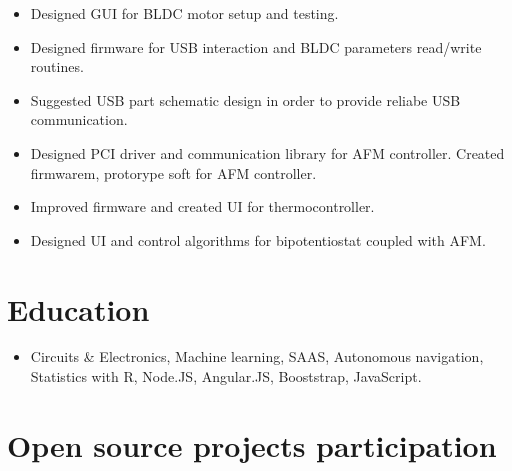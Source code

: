 \documentclass{sb_cv}
\begin{document}
\begin{itemize}
\item Designed GUI for BLDC motor setup and testing.
\item Designed firmware for USB interaction and BLDC parameters read/write routines.
\item Suggested USB part schematic design in order to provide reliabe USB communication.
\end{itemize}

\begin{itemize}
\item Designed PCI driver and communication library for AFM controller. Created firmwarem, protorype soft for AFM controller.
\item Improved firmware and created UI for thermocontroller.
\item Designed UI and control algorithms for bipotentiostat coupled with AFM.
\end{itemize}


\section{Education}
\begin{itemize}
\item Circuits \& Electronics, Machine learning, SAAS, Autonomous navigation, Statistics with R, Node.JS, Angular.JS, Booststrap, JavaScript.
\end{itemize}

\section{Open source projects participation}
\end{document}
